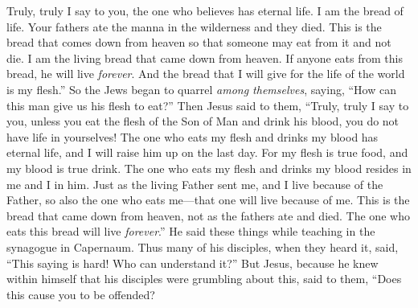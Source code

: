 \begin{biblechapter}
\verse Truly, truly I say to you, the one who believes has eternal life.
\verse I am the bread of life.
\verse Your fathers ate the manna in the wilderness and they died.
\verse This is the bread that comes down from heaven so that someone may eat from it and not die.
\verse I am the living bread that came down from heaven. If anyone eats from this bread, he will live \textit{forever}. And the bread that I will give for the life of the world is my flesh.”
\verse So the Jews began to quarrel \textit{among themselves}, saying, “How can this man give us his flesh to eat?”
\verse Then Jesus said to them, “Truly, truly I say to you, unless you eat the flesh of the Son of Man and drink his blood, you do not have life in yourselves!
\verse The one who eats my flesh and drinks my blood has eternal life, and I will raise him up on the last day.
\verse For my flesh is true food, and my blood is true drink.
\verse The one who eats my flesh and drinks my blood resides in me and I in him.
\verse Just as the living Father sent me, and I live because of the Father, so also the one who eats me—that one will live because of me.
\verse This is the bread that came down from heaven, not as the fathers ate and died. The one who eats this bread will live \textit{forever}.”
 He said these things while teaching in the synagogue in Capernaum.
\verse Thus many of his disciples, when they heard it, said, “This saying is hard! Who can understand it?”
\verse But Jesus, because he knew within himself that his disciples were grumbling about this, said to them, “Does this cause you to be offended?

\end{biblechapter}
